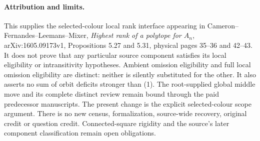 \documentclass[11pt,a4paper]{article}
\begin{document}
\paragraph{Attribution and limits.}
This supplies the selected-colour local rank interface appearing in
Cameron--Fernandes--Leemans--Mixer, \emph{Highest rank of a polytope
for $A_n$}, arXiv:1605.09173v1, Propositions 5.27 and 5.31,
physical pages 35--36 and 42--43. It does not prove that any particular
source component satisfies its local eligibility or intransitivity
hypotheses. Ambient omission eligibility and full local omission
eligibility are distinct: neither is silently substituted for the
other. It also asserts no sum of orbit deficits stronger than (1).
The root-supplied global middle move and its complete distinct
review remain bound through the paid predecessor manuscripts.
The present change is the explicit selected-colour scope argument.
There is no new census, formalization, source-wide recovery,
original credit or question credit. Connected-square rigidity and
the source's later component classification remain open obligations.
\end{document}

